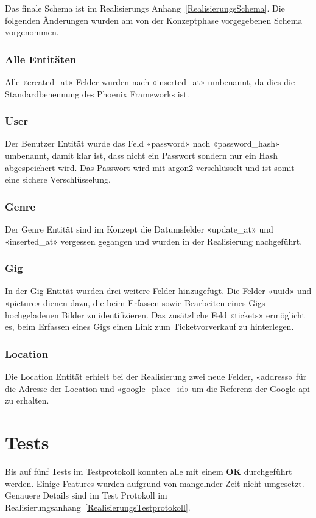 Das finale Schema ist im Realisierungs Anhang~\ref{RealisierungsSchema}.
Die folgenden Änderungen wurden am von der Konzeptphase vorgegebenen Schema
vorgenommen.

\subsubsection{Alle Entitäten}
Alle «created\_at» Felder wurden nach «inserted\_at» umbenannt, da dies die
Standardbenennung des Phoenix Frameworks ist.

\subsubsection{User}
Der Benutzer Entität wurde das Feld «password» nach «password\_hash» umbenannt,
damit klar ist, dass nicht ein Passwort sondern nur ein Hash abgespeichert wird.
Das Passwort wird mit \Gls{argon2} verschlüsselt und ist somit eine sichere Verschlüsselung.

\subsubsection{Genre}
Der Genre Entität sind im Konzept die Datumsfelder «update\_at» und «inserted\_at»
vergessen gegangen und wurden in der Realisierung nachgeführt.

\subsubsection{Gig}\label{RealisierungSchemaGig}
In der Gig Entität wurden drei weitere Felder hinzugefügt.
Die Felder «uuid» und «picture» dienen dazu, die beim Erfassen sowie
Bearbeiten eines Gigs hochgeladenen Bilder zu identifizieren.
Das zusätzliche Feld «tickets» ermöglicht es, beim Erfassen eines Gigs
einen Link zum Ticketvorverkauf zu hinterlegen.

\subsubsection{Location}
Die Location Entität erhielt bei der Realisierung zwei neue Felder,
«address» für die Adresse der Location und
«google\_place\_id» um die Referenz der Google \acrshort{api} zu erhalten.

\section{Tests}

Bis auf fünf Tests im Testprotokoll konnten alle mit einem \textbf{OK}
durchgeführt werden. Einige Features wurden aufgrund von mangelnder Zeit nicht
umgesetzt. Genauere Details sind im Test Protokoll im
Realisierungsanhang~\ref{RealisierungsTestprotokoll}.
